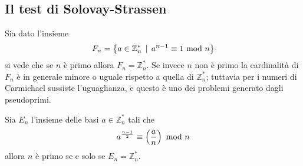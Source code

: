 



\subsection{Il test di Solovay-Strassen}
\begin{osservazione}
	Sia dato l'insieme
	\begin{equation*}
	F_n=\left\{a\in\mathbb{Z}_n^* \, \mid \, a^{n-1}\equiv1\ \mathrm{mod}\ n\right\}
	\end{equation*}
	si vede che se $n$ è primo allora $F_n=\mathbb{Z}_n^*$. Se invece $n$ non è primo la cardinalità di $F_n$ è in generale minore o uguale rispetto a quella di $\mathbb{Z}_n^*$; tuttavia per i numeri di Carmichael sussiste l'uguaglianza, e questo è uno dei problemi generato dagli pseudoprimi.
\end{osservazione}
\begin{teorema}
	Sia $E_n$ l'insieme delle basi $a\in\mathbb{Z}_n^*$ tali che 
	\begin{equation*}
	a^{\frac{n-1}{2}}\equiv\left(\frac{a}{n}\right)\ \mathrm{mod}\ n
	\end{equation*}
	allora $n$ è primo se e solo se $E_n=\mathbb{Z}_n^*$.
\end{teorema}
